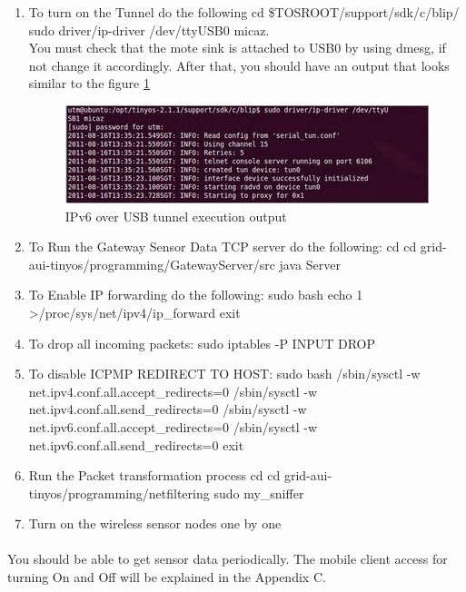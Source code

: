 \documentclass[oneside,12pt,a4paper,final]{book}
\begin{document}
\begin{enumerate}
\item To turn on the Tunnel do the following
\subitem cd \$TOSROOT/support/sdk/c/blip/ 
\subitem sudo driver/ip-driver /dev/ttyUSB0 micaz. \\
 You must check that the mote sink is attached to USB0 by using dmesg, if not change it accordingly. After that, you should have an output that looks similar to the figure \ref{fig:tunnel_output}

\begin{figure}[htbp]
\centering
\includegraphics[scale=0.9]{img/tunnel_output.jpg}
\caption{IPv6 over USB tunnel execution output}
\label{fig:tunnel_output}
\end{figure}

\item To Run the Gateway Sensor Data TCP server do the following:
\subitem cd
\subitem cd grid-aui-tinyos/programming/GatewayServer/src
\subitem java Server

\item To Enable IP forwarding do the following:
\subitem sudo bash
\subitem echo 1 \textgreater /proc/sys/net/ipv4/ip\_forward
\subitem exit

\item  To drop all incoming packets: sudo iptables -P INPUT DROP
\item To disable ICPMP REDIRECT TO HOST:
\subitem sudo bash
\subitem /sbin/sysctl -w net.ipv4.conf.all.accept\_redirects=0
\subitem /sbin/sysctl -w net.ipv4.conf.all.send\_redirects=0
\subitem /sbin/sysctl -w net.ipv6.conf.all.accept\_redirects=0
\subitem /sbin/sysctl -w net.ipv6.conf.all.send\_redirects=0
\subitem exit

\item Run the Packet transformation process
\subitem cd
\subitem cd grid-aui-tinyos/programming/netfiltering
\subitem sudo my\_sniffer

\item Turn on the wireless sensor nodes one by one
\end{enumerate}

\paragraph{}
You should be able to get sensor data periodically. The mobile client access for turning On and Off will be explained in the Appendix C.
\end{document}
